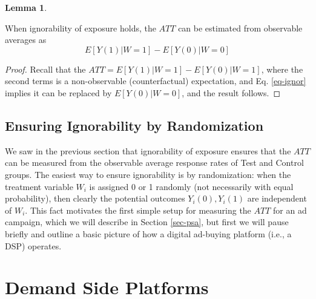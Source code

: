 \documentclass[11pt,a4paper]{article}
\theoremstyle{definition}
\theoremstyle{remark}
\theoremstyle{definition}
\theoremstyle{definition}
\theoremstyle{definition}
\theoremstyle{definition}
\theoremstyle{definition}
\theoremstyle{definition}
\newtheorem{lemma}[theorem]{Lemma}
\begin{document}
\begin{lemma} \label{lem-ignor-att}

\small When ignorability of exposure holds, the $ATT$ can be estimated from observable averages as 
$$
E[Y(1) | W = 1] - E[ Y(0) | W = 0]
$$
\begin{proof}
Recall that the $ATT = E[Y(1) | W=1] - E[Y(0) | W=1]$, where the second terms is a non-observable (counterfactual) expectation, and Eq. \ref{eq-ignor} implies it can be replaced by $E[Y(0) | W=0]$, and the result follows.
\end{proof}
\end{lemma}





\subsection{Ensuring Ignorability by Randomization}

We saw in the previous section that ignorability of exposure ensures that the $ATT$ can be measured from the observable average response rates of Test and Control groups. The easiest way to ensure ignorability is by randomization: when the treatment variable $W_i$ is assigned 0 or 1 randomly (not necessarily with equal probability), then clearly the potential outcomes $Y_i(0), Y_i(1)$ are independent of $W_i$. This fact motivates the first simple setup for measuring the $ATT$ for an ad campaign, which we will describe in Section \ref{sec-psa}, but first we will pause briefly and outline a basic picture of how a  digital ad-buying platform (i.e., a DSP) operates.


\section{Demand Side Platforms} \label{sec-rtb}
\end{document}
